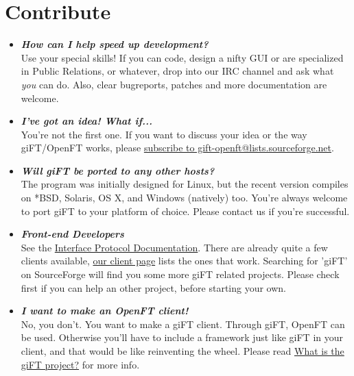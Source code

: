 \documentclass[10pt]{article}
\newcommand{\question}[1]{\item\textbf{\emph{#1}}}
\begin{document}
\section{Contribute}
\begin{itemize}

\question {How can I help speed up development?}\\
Use your special skills! If you can code, design a nifty GUI or
are specialized in Public Relations, or whatever, drop into our
IRC channel and ask what \emph{you} can do.  Also, clear
bugreports, patches and more documentation are welcome.

\question {I've got an idea! What if...}\\
You're not the first one. If you want to discuss your idea or the
way giFT/OpenFT works, please
\href{http://lists.sourceforge.net/lists/listinfo/gift-openft}{subscribe
to gift-openft@lists.sourceforge.net}.
 
\question {Will giFT be ported to any other hosts?}\\
The program was initially designed for Linux, but the recent
version compiles on *BSD, Solaris, OS X, and Windows (natively)
too. You're always welcome to port giFT to your platform of
choice. Please contact us if you're successful. 
 
\question {Front-end Developers}\\
See the
\href{http://gift.sourceforge.net/docs/?document=interface.html}{Interface
Protocol Documentation}. There are already quite a few clients
available, \href{http://gift.sourceforge.net/dev/clients.php}{our
client page} lists the ones that work. Searching for 'giFT' on
SourceForge will find you some more giFT related projects. Please
check first if you can help an other project, before starting your
own.

\question {I want to make an OpenFT client!}\\
No, you don't. You want to make a giFT client. Through giFT,
OpenFT can be used. Otherwise you'll have to include a framework
just like giFT in your client, and that would be like reinventing
the wheel. Please read
\href{http://gift.sourceforge.net/docs/?document=whatis.html}{What
is the giFT project?} for more info.

\end{itemize}
 
\end{document}

